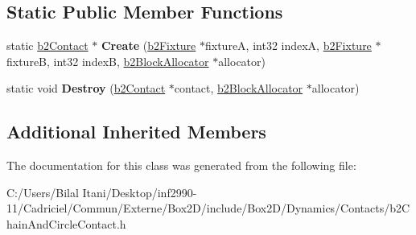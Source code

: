 \subsection*{Static Public Member Functions}
\begin{DoxyCompactItemize}
\item 
static \hyperlink{classb2_contact}{b2\+Contact} $\ast$ {\bfseries Create} (\hyperlink{classb2_fixture}{b2\+Fixture} $\ast$fixtureA, int32 indexA, \hyperlink{classb2_fixture}{b2\+Fixture} $\ast$fixtureB, int32 indexB, \hyperlink{classb2_block_allocator}{b2\+Block\+Allocator} $\ast$allocator)\hypertarget{classb2_chain_and_circle_contact_a644e6d00b903534b5b00e76c52859ad8}{}\label{classb2_chain_and_circle_contact_a644e6d00b903534b5b00e76c52859ad8}

\item 
static void {\bfseries Destroy} (\hyperlink{classb2_contact}{b2\+Contact} $\ast$contact, \hyperlink{classb2_block_allocator}{b2\+Block\+Allocator} $\ast$allocator)\hypertarget{classb2_chain_and_circle_contact_abe4320581520cd75b333200745f436b8}{}\label{classb2_chain_and_circle_contact_abe4320581520cd75b333200745f436b8}

\end{DoxyCompactItemize}
\subsection*{Additional Inherited Members}


The documentation for this class was generated from the following file\+:\begin{DoxyCompactItemize}
\item 
C\+:/\+Users/\+Bilal Itani/\+Desktop/inf2990-\/11/\+Cadriciel/\+Commun/\+Externe/\+Box2\+D/include/\+Box2\+D/\+Dynamics/\+Contacts/b2\+Chain\+And\+Circle\+Contact.\+h\end{DoxyCompactItemize}
